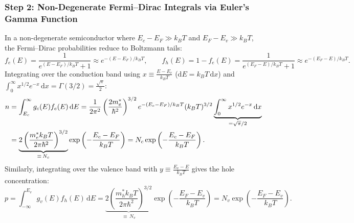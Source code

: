 \documentclass[11pt,a4paper]{article}
\newcommand{\hb}{\hbar}
\newcommand{\hbarsq}{\hb^2}
\newcommand{\dd}{\mathrm{d}}
\begin{document}
\subsubsection{Step 2: Non-Degenerate Fermi--Dirac Integrals via Euler's Gamma Function}
In a non-degenerate semiconductor where $E_c - E_F \gg k_B T$ and $E_F - E_v \gg k_B T$, the Fermi--Dirac probabilities reduce to Boltzmann tails:
\begin{equation}
    f_e(E) = \frac{1}{e^{(E-E_F)/k_BT} + 1} \approx e^{-(E-E_F)/k_BT}, \qquad f_h(E) = 1 - f_e(E) = \frac{1}{e^{(E_F-E)/k_BT} + 1} \approx e^{-(E_F-E)/k_BT}.
\end{equation}
Integrating over the conduction band using $x \equiv \frac{E - E_c}{k_B T}$ ($\dd E = k_B T\,\dd x$) and $\int_0^\infty x^{1/2}e^{-x}\,\dd x = \Gamma(3/2) = \frac{\sqrt{\pi}}{2}$:
\begin{align}
    n &= \int_{E_c}^\infty g_c(E)f_e(E)\,\dd E = \frac{1}{2\pi^2}\left(\frac{2m_e^*}{\hbarsq}\right)^{3/2} e^{-(E_c-E_F)/k_BT} (k_B T)^{3/2}\underbrace{\int_0^\infty x^{1/2}e^{-x}\,\dd x}_{=\sqrt{\pi}/2} \notag\\
    &= \underbrace{2\left(\frac{m_e^* k_B T}{2\pi\hbarsq}\right)^{3/2}}_{\equiv\, N_c} \exp\left(-\frac{E_c - E_F}{k_B T}\right) = N_c \exp\left(-\frac{E_c - E_F}{k_B T}\right).
    \label{eq:n_master}
\end{align}
Similarly, integrating over the valence band with $y \equiv \frac{E_v - E}{k_B T}$ gives the hole concentration:
\begin{equation}
    p = \int_{-\infty}^{E_v} g_v(E)f_h(E)\,\dd E = \underbrace{2\left(\frac{m_h^* k_B T}{2\pi\hbarsq}\right)^{3/2}}_{\equiv\, N_v} \exp\left(-\frac{E_F - E_v}{k_B T}\right) = N_v \exp\left(-\frac{E_F - E_v}{k_B T}\right).
    \label{eq:p_master}
\end{equation}
\end{document}
